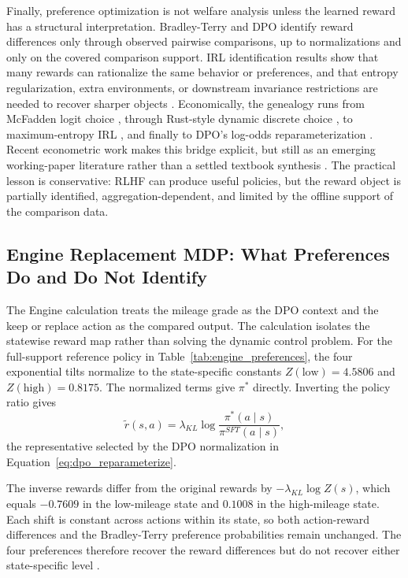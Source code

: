 Finally, preference optimization is not welfare analysis unless the learned reward has a structural interpretation. Bradley-Terry and DPO identify reward differences only through observed pairwise comparisons, up to normalizations and only on the covered comparison support. IRL identification results show that many rewards can rationalize the same behavior or preferences, and that entropy regularization, extra environments, or downstream invariance restrictions are needed to recover sharper objects \citep{cao2021identifiability,skalse2023invariance,knox2022preference}. Economically, the genealogy runs from McFadden logit choice \citep{mcfadden:1973}, through Rust-style dynamic discrete choice \citep{rust1994structural,rust1996numerical}, to maximum-entropy IRL \citep{Ziebart2008}, and finally to DPO's log-odds reparameterization \citep{rafailov2023direct}. Recent econometric work makes this bridge explicit, but still as an emerging working-paper literature rather than a settled textbook synthesis \citep{vanderlaan2025efficient,Kang2025,RustRawat2026}. The practical lesson is conservative: RLHF can produce useful policies, but the reward object is partially identified, aggregation-dependent, and limited by the offline support of the comparison data.

\FloatBarrier
\subsection{Engine Replacement MDP: What Preferences Do and Do Not Identify}
\label{engine:ch09}



The Engine calculation treats the mileage grade as the DPO context and the keep or replace action as the compared output. The calculation isolates the statewise reward map rather than solving the dynamic control problem. For the full-support reference policy in Table~\ref{tab:engine_preferences}, the four exponential tilts normalize to the state-specific constants $Z(\mathrm{low})=4.5806$ and $Z(\mathrm{high})=0.8175$. The normalized terms give $\pi^*$ directly. Inverting the policy ratio gives
\[
\widetilde r(s,a)=\lambda_{KL}\log
\frac{\pi^*(a\mid s)}{\pi^{SFT}(a\mid s)},
\]
the representative selected by the DPO normalization in Equation~\eqref{eq:dpo_reparameterize}.

The inverse rewards differ from the original rewards by $-\lambda_{KL}\log Z(s)$, which equals $-0.7609$ in the low-mileage state and $0.1008$ in the high-mileage state. Each shift is constant across actions within its state, so both action-reward differences and the Bradley-Terry preference probabilities remain unchanged. The four preferences therefore recover the reward differences but do not recover either state-specific level \citep{rafailov2023direct}.
\FloatBarrier

